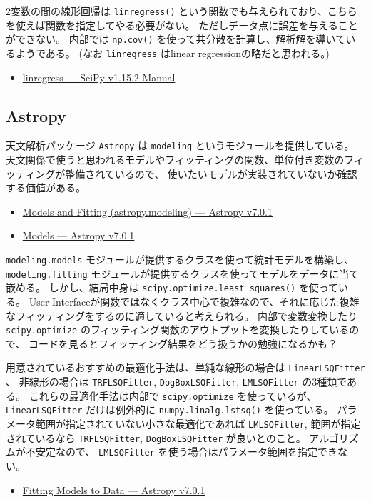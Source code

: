 \documentclass[a4paper, 9pt, notitlepage, uplatex, dvipdfmx]{jsarticle}
\begin{document}
2変数の間の線形回帰は \texttt{linregress()} という関数でも与えられており、こちらを使えば関数を指定してやる必要がない。
ただしデータ点に誤差を与えることができない。
内部では \texttt{np.cov()} を使って共分散を計算し、解析解を導いているようである。
(なお \texttt{linregress} はlinear regressionの略だと思われる。)
\begin{itemize}
\item \href{https://docs.scipy.org/doc/scipy/reference/generated/scipy.stats.linregress.html\#scipy.stats.linregress}{linregress — SciPy v1.15.2 Manual}
\end{itemize}
\subsection{Astropy}
\label{sec:org9eb326e}
天文解析パッケージ \texttt{Astropy} は \texttt{modeling} というモジュールを提供している。
天文関係で使うと思われるモデルやフィッティングの関数、単位付き変数のフィッティングが整備されているので、
使いたいモデルが実装されていないか確認する価値がある。
\begin{itemize}
\item \href{https://docs.astropy.org/en/stable/modeling/}{Models and Fitting (astropy.modeling) — Astropy v7.0.1}
\item \href{https://docs.astropy.org/en/stable/modeling/models.html}{Models — Astropy v7.0.1}
\end{itemize}

\texttt{modeling.models} モジュールが提供するクラスを使って統計モデルを構築し、
\texttt{modeling.fitting} モジュールが提供するクラスを使ってモデルをデータに当て嵌める。
しかし、結局中身は \texttt{scipy.optimize.least\_squares()} を使っている。
User Interfaceが関数ではなくクラス中心で複雑なので、それに応じた複雑なフィッティングをするのに適していると考えられる。
内部で変数変換したり \texttt{scipy.optimize} のフィッティング関数のアウトプットを変換したりしているので、
コードを見るとフィッティング結果をどう扱うかの勉強になるかも？

用意されているおすすめの最適化手法は、単純な線形の場合は \texttt{LinearLSQFitter} 、
非線形の場合は \texttt{TRFLSQFitter}, \texttt{DogBoxLSQFitter}, \texttt{LMLSQFitter} の3種類である。
これらの最適化手法は内部で \texttt{scipy.optimize} を使っているが、 \texttt{LinearLSQFitter} だけは例外的に \texttt{numpy.linalg.lstsq()} を使っている。
パラメータ範囲が指定されていない小さな最適化であれば \texttt{LMLSQFitter},
範囲が指定されているなら \texttt{TRFLSQFitter}, \texttt{DogBoxLSQFitter} が良いとのこと。
アルゴリズムが不安定なので、 \texttt{LMLSQFitter} を使う場合はパラメータ範囲を指定できない。
\begin{itemize}
\item \href{https://docs.astropy.org/en/stable/modeling/fitting.html}{Fitting Models to Data — Astropy v7.0.1}
\end{itemize}
\end{document}

